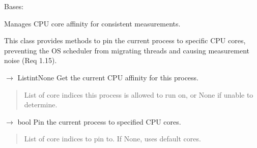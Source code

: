 \documentclass[letterpaper,10pt,english]{sphinxmanual}
\begin{document}
\begin{fulllineitems}
\label{\detokenize{core.utils.core_pinner:core.utils.core_pinner.CorePinner}}
\pysigstartsignatures
\pysiglinewithargsret
{}
{}
{}
\pysigstopsignatures
\sphinxAtStartPar
Bases: 

\sphinxAtStartPar
Manages CPU core affinity for consistent measurements.

\sphinxAtStartPar
This class provides methods to pin the current process to specific
CPU cores, preventing the OS scheduler from migrating threads and
causing measurement noise (Req 1.15).

\begin{fulllineitems}
\label{\detokenize{core.utils.core_pinner:core.utils.core_pinner.CorePinner.get_current_affinity}}
\pysigstartsignatures
\pysiglinewithargsret
{}
{}
{{ $\rightarrow$ List\DUrole{p}{{[}}int\DUrole{p}{{]}}None}}
\pysigstopsignatures
\sphinxAtStartPar
Get the current CPU affinity for this process.
\begin{quote}\begin{description}
\sphinxAtStartPar
List of core indices this process is allowed to run on,
or None if unable to determine.

\end{description}\end{quote}

\end{fulllineitems}


\begin{fulllineitems}
\label{\detokenize{core.utils.core_pinner:core.utils.core_pinner.CorePinner.pin_to_cores}}
\pysigstartsignatures
\pysiglinewithargsret
{}
{}
{{ $\rightarrow$ bool}}
\pysigstopsignatures
\sphinxAtStartPar
Pin the current process to specified CPU cores.
\begin{quote}\begin{description}
\sphinxAtStartPar
{} \textendash{} List of core indices to pin to. If None, uses default cores.


\end{description}
\end{quote}
\end{fulllineitems}
\end{fulllineitems}
\end{document}

